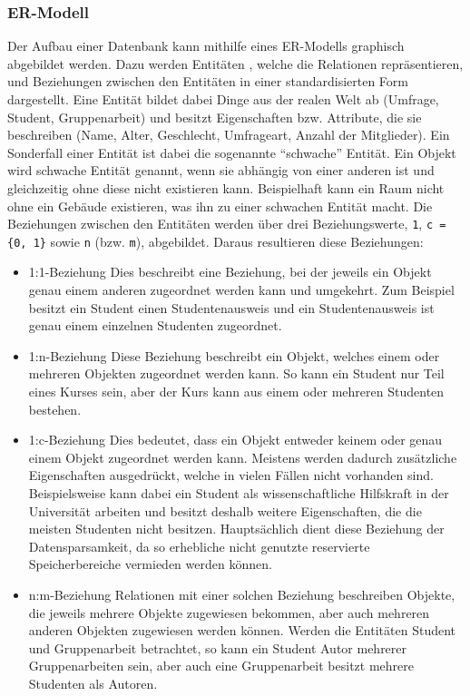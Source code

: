 \subsubsection{\acl{ER-Modell}}
Der Aufbau einer Datenbank kann mithilfe eines \acs{ER-Modell}s graphisch abgebildet werden.
Dazu werden Entitäten , welche die Relationen repräsentieren, und Beziehungen  zwischen den Entitäten in einer standardisierten Form dargestellt.
Eine Entität bildet dabei Dinge aus der realen Welt ab (Umfrage, Student, Gruppenarbeit) und besitzt Eigenschaften bzw. Attribute, die sie beschreiben (Name, Alter, Geschlecht, Umfrageart, Anzahl der Mitglieder).
Ein Sonderfall einer Entität ist dabei die sogenannte \enquote{schwache} Entität.
Ein Objekt wird schwache Entität genannt, wenn sie abhängig von einer anderen ist und gleichzeitig ohne diese nicht existieren kann.
Beispielhaft kann ein Raum nicht ohne ein Gebäude existieren, was ihn zu einer schwachen Entität macht.
Die Beziehungen zwischen den Entitäten werden über drei Beziehungswerte, \texttt{1}, \texttt{c = \{0, 1\}} sowie \texttt{n} (bzw. \texttt{m}), abgebildet.
Daraus resultieren diese Beziehungen:

\begin{itemize}
    \item 1:1-Beziehung \newline
    Dies beschreibt eine Beziehung, bei der jeweils ein Objekt genau einem anderen zugeordnet werden kann und umgekehrt.
    Zum Beispiel besitzt ein Student einen Studentenausweis und ein Studentenausweis ist genau einem einzelnen Studenten zugeordnet.
    \item 1:n-Beziehung \newline
    Diese Beziehung beschreibt ein Objekt, welches einem oder mehreren Objekten zugeordnet werden kann.
    So kann ein Student nur Teil eines Kurses sein, aber der Kurs kann aus einem oder mehreren Studenten bestehen.
    \item 1:c-Beziehung \newline
    Dies bedeutet, dass ein Objekt entweder keinem oder genau einem Objekt zugeordnet werden kann.
    Meistens werden dadurch zusätzliche Eigenschaften ausgedrückt, welche in vielen Fällen nicht vorhanden sind.
	Beispielsweise kann dabei ein Student als wissenschaftliche Hilfskraft in der Universität arbeiten und besitzt deshalb weitere Eigenschaften, die die meisten Studenten nicht besitzen.
	Hauptsächlich dient diese Beziehung der Datensparsamkeit, da so erhebliche nicht genutzte reservierte Speicherbereiche vermieden werden können.
    \item n:m-Beziehung \newline
    Relationen mit einer solchen Beziehung beschreiben Objekte, die jeweils mehrere Objekte zugewiesen bekommen, aber auch mehreren anderen Objekten zugewiesen werden können.
    Werden die Entitäten Student und Gruppenarbeit betrachtet, so kann ein Student Autor mehrerer Gruppenarbeiten sein, aber auch eine Gruppenarbeit besitzt mehrere Studenten als Autoren.
\end{itemize}

